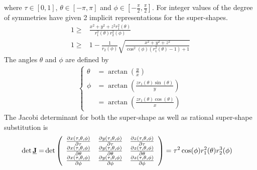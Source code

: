 where $\tau\in[0,1]$, $\theta\in[-\pi,\pi]$ and $\phi\in\left[-\frac{\pi}{2},\frac{\pi}{2}\right]$.
For integer values of the degree of symmetries \cite{Fougerolle2005,Fougerolle2005a,Fougerolle2006,Fougerolle2007} have given 2 implicit representations for the super-shapes.
\begin{align}\label{eq:SuperShapesImplicit}
1 \geq&  \frac{x^2+y^2+z^2r_1^2(\theta)}{r_1^2(\theta)r_2^2(\phi)}  \\
1 \geq&  1-\frac{1}{r_2(\phi)} \sqrt{\frac{x^2+y^2+z^2}{\cos^2(\phi)\left(r_1^2(\theta)-1\right)+1}}
\end{align}
The angles $\theta$ and $\phi$ are defined by
\begin{align}\label{eq:SuperShapesThetaPhi}
  \begin{cases}
    \theta & = \arctan\left(\frac{y}{x}\right) \\
    \phi   & = \arctan\left(\frac{zr_1(\theta)\sin(\theta)}{y}\right) \\
           & = \arctan\left(\frac{zr_1(\theta)\cos(\theta)}{x}\right)
  \end{cases}
\end{align}
The Jacobi determinant for both the super-shape as well as rational super-shape substitution is
\begin{align}\label{eq:detJ_supershapes}
\det{{\underline{\bf J}}} = &\det
  \left(
    \begin{array}{ccc}
         \frac{\partial x(\tau,\theta,\phi)}{\partial \tau}
       & \frac{\partial y(\tau,\theta,\phi)}{\partial \tau}
       & \frac{\partial z(\tau,\theta,\phi)}{\partial \tau}\\
         \frac{\partial x(\tau,\theta,\phi)}{\partial \theta}
       & \frac{\partial y(\tau,\theta,\phi)}{\partial \theta}
       & \frac{\partial z(\tau,\theta,\phi)}{\partial \theta} \\
         \frac{\partial x(\tau,\theta,\phi)}{\partial \phi}
       & \frac{\partial y(\tau,\theta,\phi)}{\partial \phi}
       & \frac{\partial z(\tau,\theta,\phi)}{\partial \phi}
    \end{array}
  \right)   =
  \tau^2 \cos (\phi ) r_1^2(\theta) r_2^3(\phi)
\end{align}

